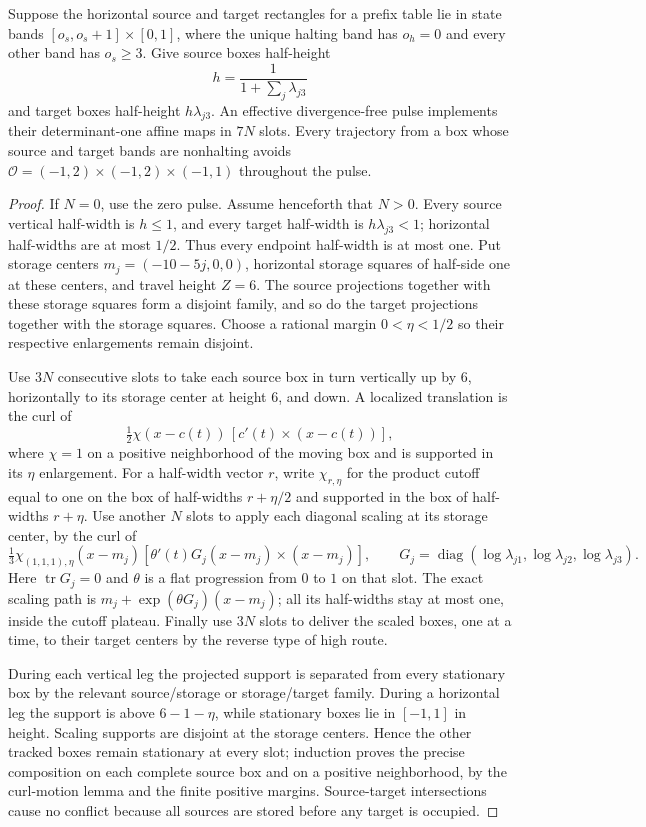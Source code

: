 \begin{lemma}\label{lem:sb-storage}
Suppose the horizontal source and target rectangles for a prefix table lie in state bands $[o_s,o_s+1]\times[0,1]$, where the unique halting band has $o_h=0$ and every other band has $o_s\ge3$.  Give source boxes half-height
\[
 h=\frac1{1+\sum_j\lambda_{j3}}
\]
and target boxes half-height $h\lambda_{j3}$.  An effective divergence-free pulse implements their determinant-one affine maps in $7N$ slots.  Every trajectory from a box whose source and target bands are nonhalting avoids
$\mathcal O=(-1,2)\times(-1,2)\times(-1,1)$ throughout the pulse.
\end{lemma}
\begin{proof}
If $N=0$, use the zero pulse. Assume henceforth that $N>0$.
Every source vertical half-width is $h\le1$, and every target half-width
is $h\lambda_{j3}<1$; horizontal half-widths are at most $1/2$.
Thus every endpoint half-width is at most one. Put storage centers $m_j=(-10-5j,0,0)$, horizontal storage squares of half-side one at these centers, and travel height $Z=6$.  The source projections together with these storage squares form a disjoint family, and so do the target projections together with the storage squares.  Choose a rational margin $0<\eta<1/2$ so their respective enlargements remain disjoint.

Use $3N$ consecutive slots to take each source box in turn vertically up by $6$, horizontally to its storage center at height $6$, and down.  A localized translation is the curl of
\[
 \tfrac12\chi(x-c(t))\,[c'(t)\times(x-c(t))],
\]
where $\chi=1$ on a positive neighborhood of the moving box and is supported in its $\eta$ enlargement.  For a half-width vector $r$, write $\chi_{r,\eta}$ for the product
cutoff equal to one on the box of half-widths $r+\eta/2$ and supported
in the box of half-widths $r+\eta$. Use another $N$ slots to apply each
diagonal scaling at its storage center, by the curl of
\[
 \tfrac13\chi_{(1,1,1),\eta}(x-m_j)
   [\theta'(t)G_j(x-m_j)\times(x-m_j)],\qquad
 G_j=\operatorname{diag}(\log\lambda_{j1},\log\lambda_{j2},\log\lambda_{j3}).
\]
Here $\operatorname{tr}G_j=0$ and $\theta$ is a flat progression from $0$ to $1$ on that slot.  The exact scaling path is $m_j+\exp(\theta G_j)(x-m_j)$; all its half-widths stay at most one, inside the cutoff plateau.  Finally use $3N$ slots to deliver the scaled boxes, one at a time, to their target centers by the reverse type of high route.

During each vertical leg the projected support is separated from every stationary box by the relevant source/storage or storage/target family.  During a horizontal leg the support is above $6-1-\eta$, while stationary boxes lie in $[-1,1]$ in height.  Scaling supports are disjoint at the storage centers.  Hence the other tracked boxes remain stationary at every slot; induction proves the precise composition on each complete source box and on a positive neighborhood, by the curl-motion lemma and the finite positive margins.  Source-target intersections cause no conflict because all sources are stored before any target is occupied.


\end{proof}
